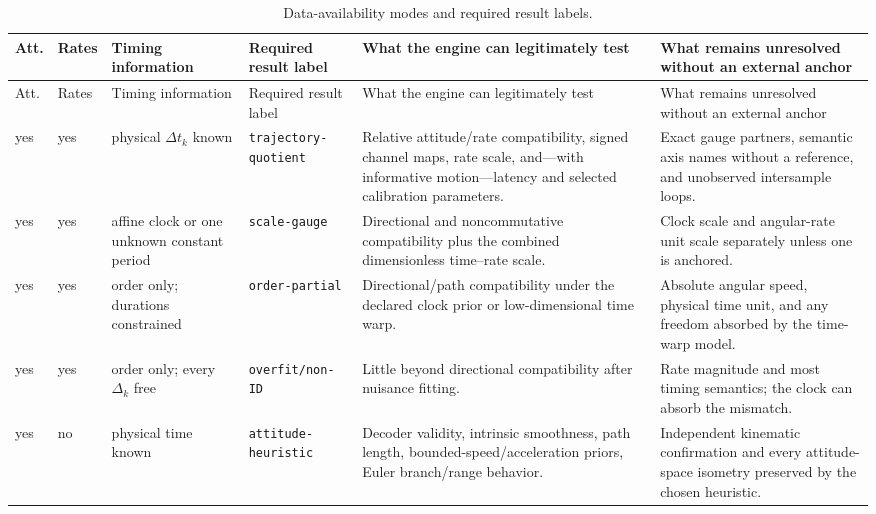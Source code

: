 \documentclass[11pt]{article}
\begin{document}
    \begingroup
    \scriptsize
    \setlength{\tabcolsep}{3pt}
    \begin{longtable}{@{}p{}p{}p{}p{}p{}p{}@{}}
        \caption{Data-availability modes and required result labels.}\label{tab:availability-modes}\\
        \toprule
        Att. & Rates & Timing information & Required result label & What the engine can legitimately test & What remains unresolved without an external anchor \\
        \midrule
        \endfirsthead
        \toprule
        Att. & Rates & Timing information & Required result label & What the engine can legitimately test & What remains unresolved without an external anchor \\
        \midrule
        \endhead
        \bottomrule
        \endlastfoot
        yes & yes & physical $\Delta t_k$ known
        & \texttt{trajectory-quotient}
        & Relative attitude/rate compatibility, signed channel maps, rate scale, and---with informative motion---latency and selected calibration parameters.
        & Exact gauge partners, semantic axis names without a reference, and unobserved intersample loops. \\
        yes & yes & affine clock or one unknown constant period
        & \texttt{scale-gauge}
        & Directional and noncommutative compatibility plus the combined dimensionless time--rate scale.
        & Clock scale and angular-rate unit scale separately unless one is anchored. \\
        yes & yes & order only; durations constrained
        & \texttt{order-partial}
        & Directional/path compatibility under the declared clock prior or low-dimensional time warp.
        & Absolute angular speed, physical time unit, and any freedom absorbed by the time-warp model. \\
        yes & yes & order only; every $\Delta_k$ free
        & \texttt{overfit/non-ID}
        & Little beyond directional compatibility after nuisance fitting.
        & Rate magnitude and most timing semantics; the clock can absorb the mismatch. \\
        yes & no & physical time known
        & \texttt{attitude-heuristic}
        & Decoder validity, intrinsic smoothness, path length, bounded-speed/acceleration priors, Euler branch/range behavior.
        & Independent kinematic confirmation and every attitude-space isometry preserved by the chosen heuristic. \\

\end{longtable}
\end{document}
